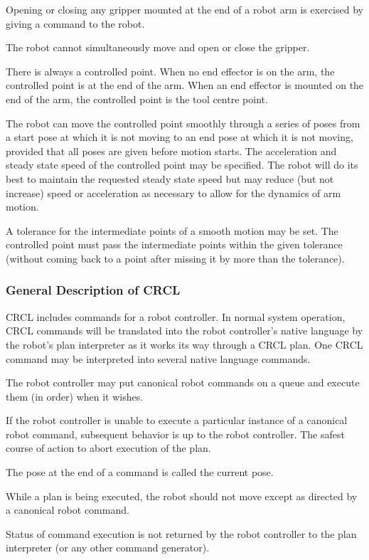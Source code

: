 Opening or closing any gripper mounted at the end of a robot arm is
exercised by giving a command to the robot.

The robot cannot simultaneously move and open or close the gripper.

There is always a controlled point. When no end effector is on the arm,
the controlled point is at the end of the arm. When an end effector
is mounted on the end of the arm, the controlled point is the tool
centre point.

The robot can move the controlled point smoothly through a series of
poses from a start pose at which it is not moving to an end pose at
which it is not moving, provided that all poses are given before
motion starts. The acceleration and steady state speed of the
controlled point may be specified. The robot will do its best to
maintain the requested steady state speed but may reduce (but not
increase) speed or acceleration as necessary to allow for the dynamics
of arm motion.

A tolerance for the intermediate points of a smooth motion may be set.
The controlled point must pass the intermediate points within the
given tolerance (without coming back to a point after missing it by
more than the tolerance).\\

\subsubsection{General Description of CRCL}

CRCL includes commands for a robot controller. In normal system operation,
CRCL commands will be translated into the robot controller's native
language by the robot's plan interpreter as it works its way through a
CRCL plan. One CRCL command may be interpreted into several native
language commands.

The robot controller may put canonical robot commands on a queue and
execute them (in order) when it wishes.

If the robot controller is unable to execute a particular instance of a
canonical robot command, subsequent behavior is up to the robot
controller. The safest course of action to abort execution of the
plan.

The pose at the end of a command is called the current pose.

While a plan is being executed, the robot should not move except as
directed by a canonical robot command.

Status of command execution is not returned by the robot controller to
the plan interpreter (or any other command generator).

